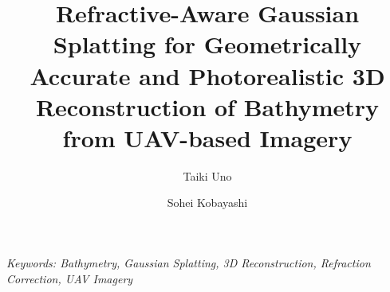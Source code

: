 \documentclass[12pt,a4paper]{article}
\renewenvironment{abstract}
  { %
    \noindent{\fontsize{12}{14}\selectfont\bfseries\itshape Abstract} %
    \fontsize{11}{13}\selectfont\itshape %
    \onehalfspacing %
  }
  { %
    \par\vspace{\baselineskip} %
  }
\begin{document}

\title{\fontsize{14}{17}\selectfont\bfseries \textbf{Refractive-Aware Gaussian Splatting for Geometrically Accurate and Photorealistic 3D Reconstruction of Bathymetry from UAV-based Imagery}}

\vspace{-0.5cm}

\author[1*]{Taiki Uno}
\author[2]{Sohei Kobayashi}

\vspace{-0.5cm}



\date{}

\thispagestyle{empty}

\maketitle

\vspace{-1.0cm}

\begin{abstract}
\end{abstract}


\vspace{-0.8cm} %
\noindent\textit{\fontsize{12pt}{14pt}\selectfont %
Keywords: \quad %
Bathymetry, Gaussian Splatting, 3D Reconstruction, Refraction Correction, UAV Imagery}
\end{document}
